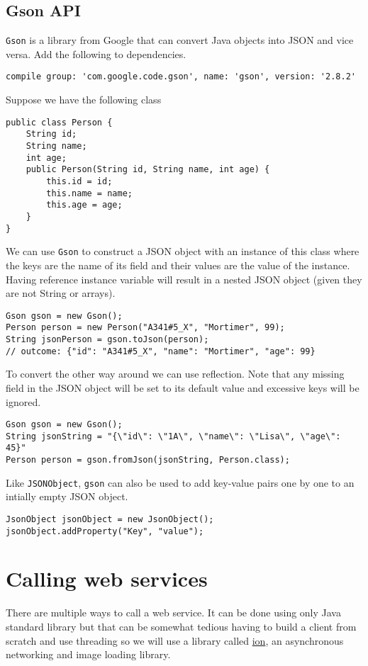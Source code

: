 \subsection{Gson API}
\texttt{Gson} is a library from Google that can convert Java objects into JSON and vice versa. Add the following to dependencies.
\begin{lstlisting}[style=A_txt]
compile group: 'com.google.code.gson', name: 'gson', version: '2.8.2'
\end{lstlisting}
Suppose we have the following class
\begin{lstlisting}[style=A_Java]
public class Person {
	String id;
	String name;
	int age;
	public Person(String id, String name, int age) {
		this.id = id;
		this.name = name;
		this.age = age;
	}
}
\end{lstlisting}
We can use \texttt{Gson} to construct a JSON object with an instance of this class where the keys are the name of its field and their values are the value of the instance. Having reference instance variable will result in a nested JSON object (given they are not String or arrays).
\begin{lstlisting}[style=A_Java]
Gson gson = new Gson();
Person person = new Person("A341#5_X", "Mortimer", 99);
String jsonPerson = gson.toJson(person);
// outcome: {"id": "A341#5_X", "name": "Mortimer", "age": 99}
\end{lstlisting}
To convert the other way around we can use reflection. Note that any missing field in the JSON object will be set to its default value and excessive keys will be ignored.
\begin{lstlisting}[style=A_Java]
Gson gson = new Gson();
String jsonString = "{\"id\": \"1A\", \"name\": \"Lisa\", \"age\": 45}"
Person person = gson.fromJson(jsonString, Person.class);
\end{lstlisting}
Like \texttt{JSONObject}, \texttt{gson} can also be used to add key-value pairs one by one to an intially empty JSON object.
\begin{lstlisting}[style=A_Java]
JsonObject jsonObject = new JsonObject();
jsonObject.addProperty("Key", "value");
\end{lstlisting}

\section{Calling web services}
There are multiple ways to call a web service. It can be done using only Java standard library but that can be somewhat tedious having to build a client from scratch and use threading so we will use a library called \href{https://github.com/koush/ion}{ion}, an asynchronous networking and image loading library.\\

